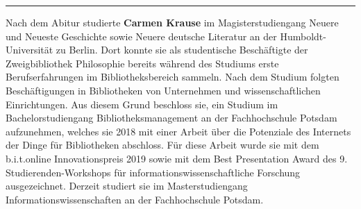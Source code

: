 \begin{center}\rule{0.5\linewidth}{0.5pt}\end{center}

Nach dem Abitur studierte \textbf{Carmen Krause} im Magisterstudiengang
Neuere und Neueste Geschichte sowie Neuere deutsche Literatur an der
Humboldt-Universität zu Berlin. Dort konnte sie als studentische
Beschäftigte der Zweigbibliothek Philosophie bereits während des
Studiums erste Berufserfahrungen im Bibliotheksbereich sammeln. Nach dem
Studium folgten Beschäftigungen in Bibliotheken von Unternehmen und
wissenschaftlichen Einrichtungen. Aus diesem Grund beschloss sie, ein
Studium im Bachelorstudiengang Bibliotheksmanagement an der
Fachhochschule Potsdam aufzunehmen, welches sie 2018 mit einer Arbeit
über die Potenziale des Internets der Dinge für Bibliotheken abschloss.
Für diese Arbeit wurde sie mit dem b.i.t.online Innovationspreis 2019
sowie mit dem Best Presentation Award des 9. Studierenden-Workshops für
informationswissenschaftliche Forschung ausgezeichnet. Derzeit studiert
sie im Masterstudiengang Informationswissenschaften an der
Fachhochschule Potsdam.
